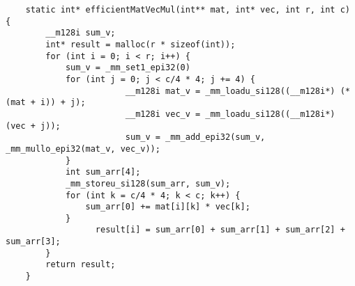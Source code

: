 \begin{solution} [0.5in]
\begin{verbatim}
    static int* efficientMatVecMul(int** mat, int* vec, int r, int c) {
        __m128i sum_v;
        int* result = malloc(r * sizeof(int));
        for (int i = 0; i < r; i++) {
            sum_v = _mm_set1_epi32(0)	
            for (int j = 0; j < c/4 * 4; j += 4) {
                        __m128i mat_v = _mm_loadu_si128((__m128i*) (*(mat + i)) + j);
                        __m128i vec_v = _mm_loadu_si128((__m128i*) (vec + j));
                        sum_v = _mm_add_epi32(sum_v, _mm_mullo_epi32(mat_v, vec_v));
            }
            int sum_arr[4];
            _mm_storeu_si128(sum_arr, sum_v);
            for (int k = c/4 * 4; k < c; k++) { 
                sum_arr[0] += mat[i][k] * vec[k]; 
            }
                  result[i] = sum_arr[0] + sum_arr[1] + sum_arr[2] + sum_arr[3];
        }
        return result;
    }
\end{verbatim}
\end{solution}


    

